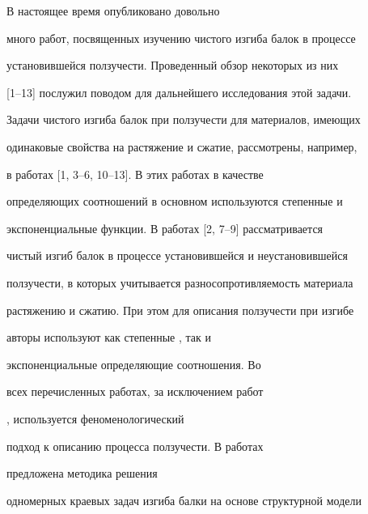


\date{07/I/2012}




\maketitle





 В настоящее время опубликовано довольно

много работ, посвященных изучению чистого изгиба балок в процессе

установившейся ползучести. Проведенный обзор некоторых из них

[1--13] послужил поводом для дальнейшего исследования этой задачи.

Задачи чистого изгиба балок при ползучести для материалов, имеющих

одинаковые свойства на растяжение и сжатие, рассмотрены, например,

в работах [1, 3--6, 10--13]. В этих работах в качестве

определяющих соотношений в основном используются степенные и

экспоненциальные функции. В работах [2, 7--9] рассматривается

чистый изгиб балок в процессе установившейся и неустановившейся

ползучести, в которых учитывается разносопротивляемость материала

растяжению и сжатию. При этом для описания ползучести при изгибе

авторы используют как степенные \cite{loko:bib2,loko:bib7}, так и

экспоненциальные \cite{loko:bib9} определяющие соотношения. Во

всех перечисленных работах, за исключением работ

\cite{loko:bib12,loko:bib13}, используется феноменологический

подход к описанию процесса ползучести. В работах

\cite{loko:bib12,loko:bib13} предложена методика решения

одномерных краевых задач изгиба балки на основе структурной модели

